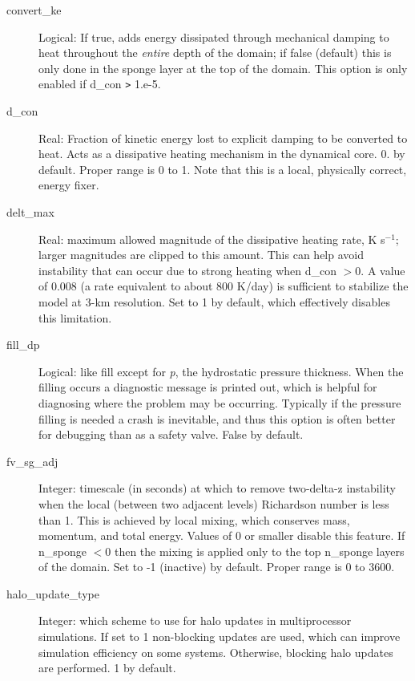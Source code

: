 \documentclass[12pt,letterpaper]{book}
\begin{document}
\begin{description}
\item[convert\_ke] Logical: If true, adds energy dissipated through mechanical damping to heat throughout the \textit{entire} depth of the domain; if false 
(default) this is only done in the sponge layer at the top of the domain. This option is only enabled if d\_con 
\texttt{>} 1.e-5. 


\item[d\_con] Real: Fraction of kinetic energy lost to explicit damping to be converted to heat. Acts as a dissipative heating mechanism in the dynamical core. 0. by default. Proper range is 0 to 1. Note that this is a local, physically correct, energy fixer.

\item[delt\_max] Real: maximum allowed magnitude of the dissipative heating rate, K s$^{-1}$; larger magnitudes are clipped to this amount. This can help avoid instability that can occur due to strong heating when d\_con $> 0$. A value of 0.008 (a rate equivalent to about 800 K/day) is sufficient to stabilize the model at 3-km resolution.  Set to 1 by default, which effectively disables this limitation.

\item[fill\_dp] Logical: like fill except for \textit{p}, the hydrostatic pressure thickness. When the filling occurs a diagnostic message is printed out, which is helpful for diagnosing where the problem may be occurring. Typically if the pressure filling is needed a crash is inevitable, and thus this option is often better for debugging than as a 
safety valve. False by default. 


\item[fv\_sg\_adj] Integer: timescale (in seconds) at which to remove two-delta-z instability when the local 
(between two adjacent levels) Richardson number is less than 1. This is achieved by local mixing, which conserves  mass, momentum, and total energy.  Values of 0 or smaller disable this feature. If n\_sponge $< 0$ then the mixing is applied only to the top n\_sponge layers of the domain. Set to -1  (inactive) by default. Proper range is 0 to 3600.


\item[halo\_update\_type] Integer: which scheme to use for halo updates in multiprocessor simulations. If set to 
1 non-blocking updates are used, which can improve simulation efficiency on some systems. Otherwise, blocking halo updates are performed. 
1 by default.
 


\end{description}
\end{document}
